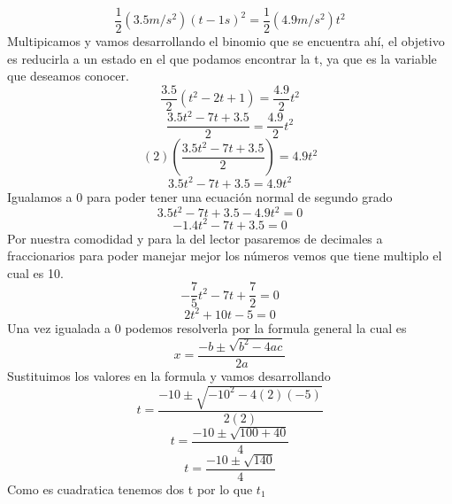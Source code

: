\documentclass[letterpaper, 12pt]{article}
\begin{document}
\begin{enumerate}
\begin{enumerate}
\begin{equation}
\label{Eq inciso 2 ya igualada}
    \frac{1}{2} (3.5 m/s^2)(t-1s)^2 = \frac{1}{2} (4.9 m/s^2)t^2
\end{equation}
Multipicamos y vamos desarrollando el binomio que se encuentra ahí, el objetivo es reducirla a un estado en el que podamos encontrar la t, ya que es la variable que deseamos conocer.
\begin{equation}
    \frac{3.5}{2} (t^2 - 2t + 1) = \frac{4.9}{2} t^2
\end{equation}
\begin{equation}
    \frac{3.5t^2 - 7t + 3.5}{2} = \frac{4.9}{2} t^2
\end{equation}
\begin{equation}
    (2)(\frac{3.5t^2 - 7t + 3.5}{2}) = 4.9t^2
\end{equation}
\begin{equation}
    3.5t^2 - 7t + 3.5 = 4.9t^2
\end{equation}
Igualamos a 0 para poder tener una ecuación normal de segundo grado
\begin{equation}
    3.5t^2 - 7t + 3.5 - 4.9t^2 = 0
\end{equation}
\begin{equation}
    -1.4t^2 - 7t + 3.5  = 0
\end{equation}
Por nuestra comodidad y para la del lector pasaremos de decimales a fraccionarios para poder manejar mejor los números vemos que tiene multiplo el cual es 10.
\begin{equation}
    -\frac{7}{5}t^2 - 7t + \frac{7}{2}  = 0
\end{equation}
\begin{equation}
    2t^2 + 10t -5 = 0
\end{equation}
Una vez igualada a 0 podemos resolverla por la formula general la cual es 
\begin{equation}
     x = \frac{-b \pm \sqrt{b^2 - 4ac}}{2a}
\end{equation}
Sustituimos los valores en la formula y vamos desarrollando
\begin{equation}
    t = \frac{- 10 \pm \sqrt{-10^2 - 4(2)(-5)}}{2(2)}
\end{equation}
\begin{equation}
    t = \frac{- 10 \pm \sqrt{100+40}}{4}
\end{equation}
\begin{equation}
    t = \frac{- 10 \pm \sqrt{140}}{4}
\end{equation}
Como es cuadratica tenemos dos t por lo que $t_1$

\end{enumerate}
\end{enumerate}
\end{document}
